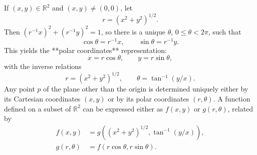 If $(x, y) \in \mathbb{R}^2$ and $(x, y) \neq (0, 0)$, let
$$
r = (x^2 + y^2)^{1/2}.
$$
Then $(r^{-1}x)^2 + (r^{-1}y)^2 = 1$, so there is a unique $\theta$, $0 \leq \theta < 2\pi$, such that
$$
\cos \theta = r^{-1}x, \qquad \sin \theta = r^{-1}y.
$$
This yields the **polar coordinates** representation:
$$
x = r \cos \theta, \qquad y = r \sin \theta,
$$
with the inverse relations
$$
r = (x^2 + y^2)^{1/2}, \qquad \theta = \tan^{-1}(y/x).
$$
Any point $p$ of the plane other than the origin is determined uniquely either by its Cartesian coordinates $(x, y)$ or by its polar coordinates $(r, \theta)$. A function defined on a subset of $\mathbb{R}^2$ can be expressed either as $f(x, y)$ or $g(r, \theta)$, related by
\begin{align}
f(x, y) &= g((x^2 + y^2)^{1/2}, \tan^{-1}(y/x)), \\
g(r, \theta) &= f(r \cos \theta, r \sin \theta).
\end{align}
